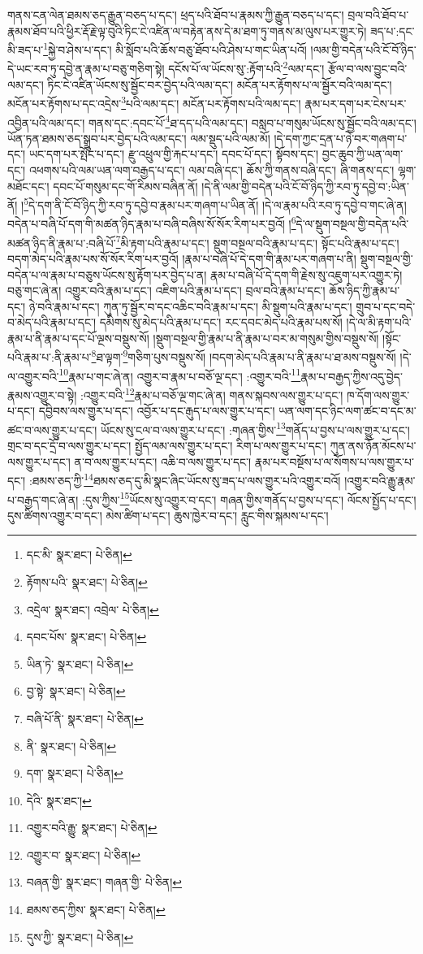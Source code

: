 གནས་ངན་ལེན་ཐམས་ཅད་རྒྱུན་བཅད་པ་དང་། ཕྲད་པའི་ཐོབ་པ་རྣམས་ཀྱི་རྒྱུན་བཅད་པ་དང་། བྲལ་བའི་ཐོབ་པ་རྣམས་ཐོབ་པའི་ཕྱིར་རྡོ་རྗེ་ལྟ་བུའི་ཏིང་ངེ་འཛིན་ལ་བརྟེན་ནས་དེ་མ་ཐག་ཏུ་གནས་མ་ལུས་པར་གྱུར་ཏེ། ཟད་པ་:དང་མི་ཟད་པ་\footnote{དང་མི་  སྣར་ཐང་།  པེ་ཅིན། }སྐྱེ་བ་ཤེས་པ་དང་། མི་སློབ་པའི་ཆོས་བཅུ་ཐོབ་པའི་ཤེས་པ་གང་ཡིན་པའོ། །ལམ་གྱི་བདེན་པའི་ངོ་བོ་ཉིད་དེ་ཡང་རབ་ཏུ་དབྱེ་ན་རྣམ་པ་བཅུ་གཅིག་སྟེ། དངོས་པོ་ལ་ཡོངས་སུ་:རྟོག་པའི་\footnote{རྟོགས་པའི་  སྣར་ཐང་།  པེ་ཅིན། }ལམ་དང་། རྩོལ་བ་ལས་བྱུང་བའི་ལམ་དང་། ཏིང་ངེ་འཛིན་ཡོངས་སུ་སྦྱོང་བར་བྱེད་པའི་ལམ་དང་། མངོན་པར་རྟོགས་པ་ལ་སྦྱོར་བའི་ལམ་དང་། མངོན་པར་རྟོགས་པ་དང་འདྲེས་\footnote{འདྲེལ་  སྣར་ཐང་། འབྲེལ་  པེ་ཅིན། }པའི་ལམ་དང་། མངོན་པར་རྟོགས་པའི་ལམ་དང་། རྣམ་པར་དག་པར་ངེས་པར་འབྱིན་པའི་ལམ་དང་། གནས་དང་:དབང་པོ་\footnote{དབང་པོས་  སྣར་ཐང་།  པེ་ཅིན། }ཐ་དད་པའི་ལམ་དང་། བསླབ་པ་གསུམ་ཡོངས་སུ་སྦྱོང་བའི་ལམ་དང་། ཡོན་ཏན་ཐམས་ཅད་སྒྲུབ་པར་བྱེད་པའི་ལམ་དང་། ལམ་སྡུད་པའི་ལམ་མོ། །དེ་དག་ཀྱང་དྲན་པ་ཉེ་བར་གཞག་པ་དང་། ཡང་དག་པར་སྤོང་པ་དང་། རྫུ་འཕྲུལ་གྱི་རྐང་པ་དང་། དབང་པོ་དང་། སྟོབས་དང་། བྱང་ཆུབ་ཀྱི་ཡན་ལག་དང་། འཕགས་པའི་ལམ་ཡན་ལག་བརྒྱད་པ་དང་། ལམ་བཞི་དང་། ཆོས་ཀྱི་གནས་བཞི་དང་། ཞི་གནས་དང་། ལྷག་མཐོང་དང་། དབང་པོ་གསུམ་དང་གོ་རིམས་བཞིན་ནོ། །དེ་ནི་ལམ་གྱི་བདེན་པའི་ངོ་བོ་ཉིད་ཀྱི་རབ་ཏུ་དབྱེ་བ་:ཡིན་ནོ། །\footnote{ཡིན་ཏེ་  སྣར་ཐང་།  པེ་ཅིན། }དེ་དག་ནི་ངོ་བོ་ཉིད་ཀྱི་རབ་ཏུ་དབྱེ་བ་རྣམ་པར་གཞག་པ་ཡིན་ནོ། །དེ་ལ་རྣམ་པའི་རབ་ཏུ་དབྱེ་བ་གང་ཞེ་ན། བདེན་པ་བཞི་པོ་དག་གི་མཚན་ཉིད་རྣམ་པ་བཞི་བཞིས་སོ་སོར་རིག་པར་བྱའོ། །\footnote{བྱ་སྟེ་  སྣར་ཐང་།  པེ་ཅིན། }དེ་ལ་སྡུག་བསྔལ་གྱི་བདེན་པའི་མཚན་ཉིད་ནི་རྣམ་པ་:བཞི་པོ་\footnote{བཞི་པོ་ནི་  སྣར་ཐང་།  པེ་ཅིན། }མི་རྟག་པའི་རྣམ་པ་དང་། སྡུག་བསྔལ་བའི་རྣམ་པ་དང་། སྟོང་པའི་རྣམ་པ་དང་། བདག་མེད་པའི་རྣམ་པས་སོ་སོར་རིག་པར་བྱའོ། །རྣམ་པ་བཞི་པོ་དེ་དག་གི་རྣམ་པར་གཞག་པ་ནི། སྡུག་བསྔལ་གྱི་བདེན་པ་ལ་རྣམ་པ་བཅུས་ཡོངས་སུ་རྟོག་པར་བྱེད་པ་ན། རྣམ་པ་བཞི་པོ་དེ་དག་གི་རྗེས་སུ་འཇུག་པར་འགྱུར་ཏེ། བཅུ་གང་ཞེ་ན། འགྱུར་བའི་རྣམ་པ་དང་། འཇིག་པའི་རྣམ་པ་དང་། བྲལ་བའི་རྣམ་པ་དང་། ཆོས་ཉིད་ཀྱི་རྣམ་པ་དང་། ཉེ་བའི་རྣམ་པ་དང་། ཀུན་ཏུ་སྦྱོར་བ་དང་འཆིང་བའི་རྣམ་པ་དང་། མི་སྡུག་པའི་རྣམ་པ་དང་། གྲུབ་པ་དང་བདེ་བ་མེད་པའི་རྣམ་པ་དང་། དམིགས་སུ་མེད་པའི་རྣམ་པ་དང་། རང་དབང་མེད་པའི་རྣམ་པས་སོ། །དེ་ལ་མི་རྟག་པའི་རྣམ་པ་ནི་རྣམ་པ་དང་པོ་ལྔས་བསྡུས་སོ། །སྡུག་བསྔལ་གྱི་རྣམ་པ་ནི་རྣམ་པ་བར་མ་གསུམ་གྱིས་བསྡུས་སོ། །སྟོང་པའི་རྣམ་པ་:ནི་རྣམ་པ་\footnote{ནི་  སྣར་ཐང་།  པེ་ཅིན། }ཐ་ལྟག་\footnote{དག་  སྣར་ཐང་།  པེ་ཅིན། }གཅིག་པུས་བསྡུས་སོ། །བདག་མེད་པའི་རྣམ་པ་ནི་རྣམ་པ་ཐ་མས་བསྡུས་སོ། །དེ་ལ་འགྱུར་བའི་\footnote{དེའི་  སྣར་ཐང་། }རྣམ་པ་གང་ཞེ་ན། འགྱུར་བ་རྣམ་པ་བཅོ་ལྔ་དང་། :འགྱུར་བའི་\footnote{འགྱུར་བའི་རྒྱུ་  སྣར་ཐང་།  པེ་ཅིན། }རྣམ་པ་བརྒྱད་ཀྱིས་འདུ་བྱེད་རྣམས་འགྱུར་བ་སྟེ། :འགྱུར་བའི་\footnote{འགྱུར་བ་  སྣར་ཐང་།  པེ་ཅིན། }རྣམ་པ་བཅོ་ལྔ་གང་ཞེ་ན། གནས་སྐབས་ལས་གྱུར་པ་དང་། ཁ་དོག་ལས་གྱུར་པ་དང་། དབྱིབས་ལས་གྱུར་པ་དང་། འབྱོར་པ་དང་རྒུད་པ་ལས་གྱུར་པ་དང་། ཡན་ལག་དང་ཉིང་ལག་ཚང་བ་དང་མ་ཚང་བ་ལས་གྱུར་པ་དང་། ཡོངས་སུ་ངལ་བ་ལས་གྱུར་པ་དང་། :གཞན་གྱིས་\footnote{བཞན་གྱི་  སྣར་ཐང་། གཞན་གྱི་  པེ་ཅིན། }གནོད་པ་བྱས་པ་ལས་གྱུར་པ་དང་། གྲང་བ་དང་དྲོ་བ་ལས་གྱུར་པ་དང་། སྤྱོད་ལམ་ལས་གྱུར་པ་དང་། རིག་པ་ལས་གྱུར་པ་དང་། ཀུན་ནས་ཉོན་མོངས་པ་ལས་གྱུར་པ་དང་། ན་བ་ལས་གྱུར་པ་དང་། འཆི་བ་ལས་གྱུར་པ་དང་། རྣམ་པར་བསྔོས་པ་ལ་སོགས་པ་ལས་གྱུར་པ་དང་། :ཐམས་ཅད་ཀྱི་\footnote{ཐམས་ཅད་ཀྱིས་  སྣར་ཐང་།  པེ་ཅིན། }ཐམས་ཅད་དུ་མི་སྣང་ཞིང་ཡོངས་སུ་ཟད་པ་ལས་གྱུར་པའི་འགྱུར་བའོ། །འགྱུར་བའི་རྒྱུ་རྣམ་པ་བརྒྱད་གང་ཞེ་ན། :དུས་ཀྱིས་\footnote{དུས་ཀྱི་  སྣར་ཐང་།  པེ་ཅིན། }ཡོངས་སུ་འགྱུར་བ་དང་། གཞན་གྱིས་གནོད་པ་བྱས་པ་དང་། ལོངས་སྤྱོད་པ་དང་། དུས་ཚིགས་འགྱུར་བ་དང་། མེས་ཚིག་པ་དང་། ཆུས་ཁྱེར་བ་དང་། རླུང་གིས་སྐམས་པ་དང་། 